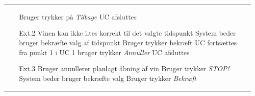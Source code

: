\begin{longtable}{>{\bfseries}p{100pt} p{300pt}}
\begin{enumerate}
		\subitem[1.1a] Bruger trykker på \emph{Tilbage}
		\subitem[1.2b] UC afsluttes
		\item[Ext.2] Vinen kan ikke iltes korrekt til det valgte tidspunkt
		\subitem[2.1] System beder bruger bekræfte valg af tidspunkt
		\subitem[2.2a] Bruger trykker bekræft
		\subitem[2.3a] UC fortsættes fra punkt 1 i UC 1
		\subitem[2.2b] bruger trykker \emph{Annuller}
		\subitem[2.3b] UC afsluttes
		\item[Ext.3] Bruger annullerer planlagt åbning af vin
		\subitem[3.1] Bruger trykker \emph{STOP!}
		\subitem[3.2] System beder bruger bekræfte valg
		\subitem[3.3a] Bruger trykker \emph{Bekræft}
	\end{enumerate}
\end{longtable}
